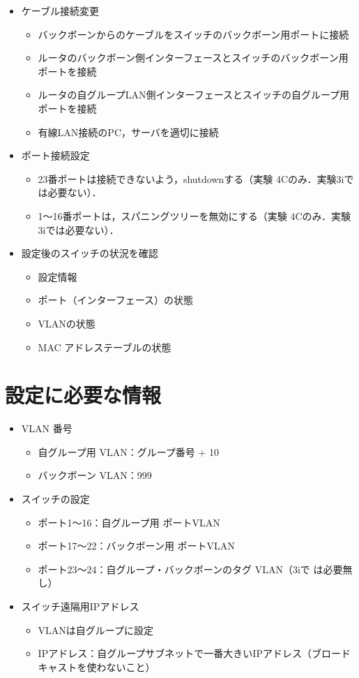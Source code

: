 \begin{itemize}
\item ケーブル接続変更    
    \begin{itemize}
        \item バックボーンからのケーブルをスイッチのバックボーン用ポートに接続
    \item ルータのバックボーン側インターフェースとスイッチのバックボーン用ポートを接続
    \item ルータの自グループLAN側インターフェースとスイッチの自グループ用ポートを接続
    \item 有線LAN接続のPC，サーバを適切に接続
    \end{itemize}
    
\item ポート接続設定
    \begin{itemize}
    \item 23番ポートは接続できないよう，shutdownする（実験 4Cのみ．実験3iでは必要ない）．
    \item 1～16番ポートは，スパニングツリーを無効にする（実験 4Cのみ．実験3iでは必要ない）．
    \end{itemize}
    
\item 設定後のスイッチの状況を確認
    \begin{itemize}
    \item 設定情報
    \item ポート（インターフェース）の状態
    \item VLANの状態
    \item MAC アドレステーブルの状態
    \end{itemize}
\end{itemize}

\section{設定に必要な情報}

\begin{itemize}
 \item VLAN 番号
       \begin{itemize}
	\item 自グループ用 VLAN：グループ番号 + 10
	\item バックボーン VLAN：999
       \end{itemize}
 \item スイッチの設定
       \begin{itemize}
	\item ポート1〜16：自グループ用 ポートVLAN
	\item ポート17〜22：バックボーン用 ポートVLAN
	\item ポート23〜24：自グループ・バックボーンのタグ VLAN（3iで
	      は必要無し）
       \end{itemize}
 \item スイッチ遠隔用IPアドレス
    \begin{itemize}
        \item VLANは自グループに設定
        \item IPアドレス：自グループサブネットで一番大きいIPアドレス（ブロードキャストを使わないこと）
    \end{itemize}
\end{itemize}

